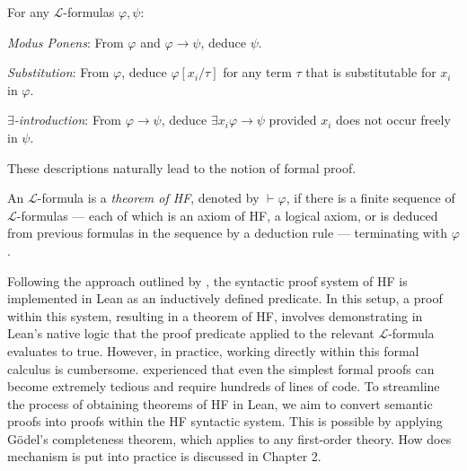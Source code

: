 \begin{definition}
    \label{def:prf.MP+prf.Subst+prf.ExIntro}
    For any $\mathcal{L}$-formulas $\varphi, \psi$:
    \begin{description}
        \item \textit{Modus Ponens}: 
        From $\varphi$ and $\varphi \rightarrow \psi$, deduce $\psi$.
        \item \textit{Substitution}:
        From $\varphi$, deduce $\varphi[x_i/\tau]$ for any term $\tau$ that is substitutable for
        $x_i$ in $\varphi$.
        \item \textit{$\exists$-introduction}:
        From $\varphi \rightarrow \psi$, deduce $\exists x_i \varphi \rightarrow \psi$ provided
        $x_i$ does not occur freely in $\psi$.
    \end{description}
\end{definition}

These descriptions naturally lead to the notion of formal proof.

\begin{definition}[Theorem of HF]
    \label{def:prf}
    An $\mathcal{L}$-formula is a \textit{theorem of HF}, denoted by $\vdash \varphi$, 
    if there is a finite sequence of $\mathcal{L}$-formulas — each of which is an axiom of HF, 
    a logical axiom, or is deduced from previous formulas in the sequence by a deduction rule —
    terminating with $\varphi$.
\end{definition}

Following the approach outlined by \cite{paulson2014machine}, 
the syntactic proof system of HF is implemented in Lean as an inductively defined predicate. 
In this setup, a proof within this system, resulting in a theorem of HF, 
involves demonstrating in Lean’s native logic that 
the proof predicate applied to the relevant $\mathcal{L}$-formula evaluates to true.
However, in practice, working directly within this formal calculus is cumbersome. 
\cite{paulson2014machine} experienced that even the simplest formal proofs can become extremely 
tedious and require hundreds of lines of code.
To streamline the process of obtaining theorems of HF in Lean, 
we aim to convert semantic proofs into proofs within the HF syntactic system. 
This is possible by applying Gödel's completeness theorem, which applies to any first-order theory.
How does mechanism is put into practice is discussed in Chapter 2.

